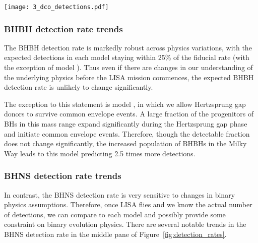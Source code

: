 \begin{figure*}[p]
    \centering
    \texttt{[image: 3\_dco\_detections.pdf]}
    \caption{The number of expected detections in the LISA mission for different DCO types and model variations. Error bars show the 50\% (solid) and 90\% (dotted) confidence intervals. The left axis and grid lines show the number of detections in a four year LISA mission and the right axis shows an approximation of the number of detections in a 10 year mission (we scale the axis by $\sqrt{T_{\rm obs}}$, see Table~\ref{tab:detection_rates} for exact rates). Each model is described in further detail in Table~\ref{tab:physics_variations} and details of the fiducial assumptions are in Section~\ref{sec:fiducial_physics}. }
    \label{fig:detection_rates}
\end{figure*}

\subsubsection{BHBH detection rate trends}
The BHBH detection rate is markedly robust across physics variations, with the expected detections in each model staying within 25\% of the fiducial rate (with the exception of model \modOpt{}). Thus even if there are changes in our understanding of the underlying physics before the LISA mission commences, the expected BHBH detection rate is unlikely to change significantly.

The exception to this statement is model \modOpt{}, in which we allow Hertzsprung gap donors to survive common envelope events. A large fraction of the progenitors of BHs in this mass range expand significantly during the Hertzsprung gap phase and initiate common envelope events. Therefore, though the detectable fraction does not change significantly, the increased population of BHBHs in the Milky Way leads to this model predicting 2.5 times more detections.

\subsubsection{BHNS detection rate trends}
In contrast, the BHNS detection rate is very sensitive to changes in binary physics assumptions. Therefore, once LISA flies and we know the actual number of detections, we can compare to each model and possibly provide some constraint on binary evolution physics. There are several notable trends in the BHNS detection rate in the middle pane of Figure~\ref{fig:detection_rates}.

